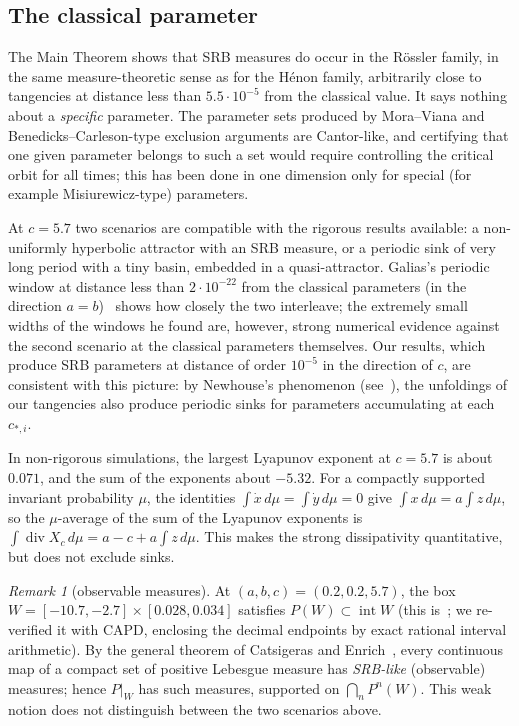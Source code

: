 \documentclass[11pt]{amsart}
\theoremstyle{definition}
\theoremstyle{remark}
\newtheorem{remark}[thm]{Remark}
\begin{document}
\subsection*{The classical parameter}
The Main Theorem shows that SRB measures do occur in the R\"ossler family, in the
same measure-theoretic sense as for the H\'enon family, arbitrarily close to tangencies at distance less than
$5.5\cdot10^{-5}$ from the classical value. It says nothing about a \emph{specific} parameter. The parameter
sets produced by Mora--Viana and Benedicks--Carleson-type exclusion arguments are Cantor-like, and certifying
that one given parameter belongs to such a set would require controlling the critical orbit for all times;
this has been done in one dimension only for special (for example Misiurewicz-type) parameters.

At $c=5.7$ two scenarios are compatible with the rigorous results available: a non-uniformly hyperbolic
attractor with an SRB measure, or a periodic sink of very long period with a tiny basin, embedded in a
quasi-attractor. Galias's periodic window at distance less than $2\cdot10^{-22}$ from the classical parameters
(in the direction $a=b$)~\cite{Gal26} shows how closely the two interleave; the extremely small widths of the
windows he found are, however, strong numerical evidence against the second scenario at the classical
parameters themselves. Our results, which produce SRB parameters at distance of order $10^{-5}$ in the
direction of $c$, are consistent with this picture: by Newhouse's phenomenon (see~\cite{New04}), the unfoldings of our tangencies
also produce periodic sinks for parameters accumulating at each $c_{*,i}$.

In non-rigorous simulations, the largest Lyapunov exponent at $c=5.7$ is about $0.071$, and the sum of the
exponents about $-5.32$. For a compactly supported invariant probability $\mu$, the identities
$\int\dot x\,d\mu=\int\dot y\,d\mu=0$ give $\int x\,d\mu=a\int z\,d\mu$, so the $\mu$-average of the sum of the
Lyapunov exponents is $\int\operatorname{div}X_c\,d\mu=a-c+a\int z\,d\mu$. This makes the strong dissipativity
quantitative, but does not exclude sinks.

\begin{remark}[observable measures]\label{rem:observable}
At $(a,b,c)=(0.2,0.2,5.7)$, the box $W=[-10.7,-2.7]\times[0.028,0.034]$ satisfies $P(W)\subset\operatorname{int}W$
(this is~\cite[Theorem~2]{CAPD21}; we re-verified it with CAPD, enclosing the decimal endpoints by exact
rational interval arithmetic). By the general theorem of Catsigeras and Enrich~\cite[Theorem~1]{CE11}, every
continuous map of a compact set of positive Lebesgue measure has \emph{SRB-like} (observable) measures; hence
$P|_W$ has such measures, supported on $\bigcap_nP^n(W)$. This weak notion does not distinguish between the
two scenarios above.
\end{remark}
\end{document}
